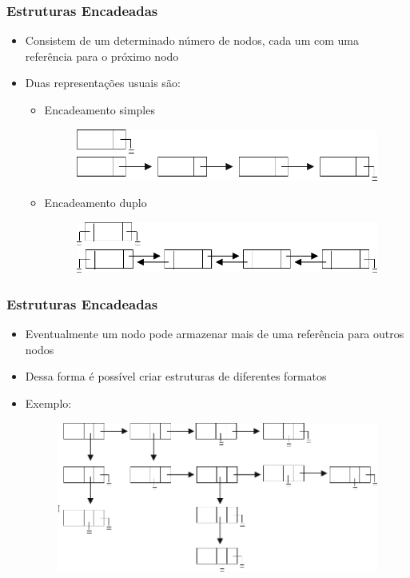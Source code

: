 \documentclass[aspectratio=169]{beamer}
\begin{document}
\begin{frame}\frametitle{Estruturas Encadeadas}
\begin{itemize}
	\item Consistem de um determinado número de nodos, cada um com uma referência para o próximo nodo
	\item Duas representações usuais são:
	\begin{itemize}
		\item Encadeamento simples
\begin{figure}[h]
	\includegraphics[height=0.14\paperheight]{pucrs-ec-poo-unidade_12-estruturas_encadeadas-laminas-estrutura_encadeada_02.png}
\end{figure}
		\item Encadeamento duplo
\begin{figure}[h]
	\includegraphics[height=0.15\paperheight]{pucrs-ec-poo-unidade_12-estruturas_encadeadas-laminas-estrutura_encadeada_03.png}
\end{figure}
	\end{itemize}
\end{itemize}
\end{frame}

\begin{frame}\frametitle{Estruturas Encadeadas}
\begin{itemize}
	\item Eventualmente um nodo pode armazenar mais de uma referência para outros nodos
	\item Dessa forma é possível criar estruturas de diferentes formatos
	\item Exemplo:
\begin{figure}[h]
	\includegraphics[height=0.5\paperheight]{pucrs-ec-poo-unidade_12-estruturas_encadeadas-laminas-estrutura_encadeada_04.png}
\end{figure}
\end{itemize}
\end{frame}
\end{document}
